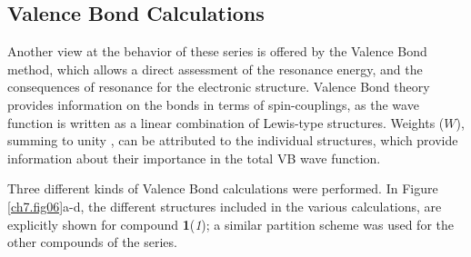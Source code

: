\subsection{Valence Bond Calculations}

Another view at the behavior of these series is offered by the Valence Bond method, which allows a direct assessment of the resonance energy, and the consequences of resonance for the electronic structure. Valence Bond theory provides information on the bonds in terms of spin-couplings, as the wave function is written as a linear combination of Lewis-type structures. Weights ($W$), summing to unity  \cite{r37}, can be attributed to the individual structures, which provide information about their importance in the total VB wave function.

Three different kinds of Valence Bond calculations were performed. In Figure \ref{ch7.fig06}a-d, the different structures included in the various calculations, are explicitly shown for compound \textbf{1}(\textit{1}); a similar partition scheme was used for the other compounds of the series.
